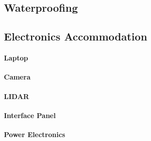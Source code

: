\subsection{Waterproofing}

\subsection{Electronics Accommodation}
\paragraph{Laptop}

\paragraph{Camera}

\paragraph{LIDAR}

\paragraph{Interface Panel}

\paragraph{Power Electronics}

